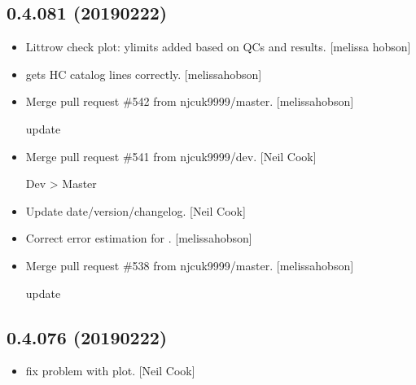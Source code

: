 \documentclass[a4paper,10pt,english]{report}
\begin{document}
\subsection{0.4.081 (2019\sphinxhyphen{}02\sphinxhyphen{}22)}
\label{\detokenize{misc/changelog:id198}}\begin{itemize}
\item {} 
Littrow check plot: ylimits added based on QCs and results. {[}melissa\sphinxhyphen{}
hobson{]}

\item {} 
 gets HC catalog lines correctly. {[}melissa\sphinxhyphen{}hobson{]}

\item {} 
Merge pull request \#542 from njcuk9999/master. {[}melissa\sphinxhyphen{}hobson{]}

update

\item {} 
Merge pull request \#541 from njcuk9999/dev. {[}Neil Cook{]}

Dev \textendash{}\textgreater{} Master

\item {} 
Update date/version/changelog. {[}Neil Cook{]}

\item {} 
Correct error estimation for . {[}melissa\sphinxhyphen{}hobson{]}

\item {} 
Merge pull request \#538 from njcuk9999/master. {[}melissa\sphinxhyphen{}hobson{]}

update

\end{itemize}


\subsection{0.4.076 (2019\sphinxhyphen{}02\sphinxhyphen{}22)}
\label{\detokenize{misc/changelog:id199}}\begin{itemize}
\item {} 
 \sphinxhyphen{} fix problem with  plot. {[}Neil
Cook{]}

\end{itemize}
\end{document}
